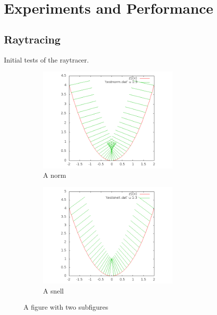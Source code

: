 \section{Experiments and Performance}
\label{experiments}

\subsection{Raytracing}

Initial tests of the raytracer.

\begin{figure}
\centering
\begin{subfigure}{.5\textwidth}
  \centering
  \includegraphics[width=7cm]{out.png}
  \caption{A norm}
  \label{fig:sub1}
\end{subfigure}%
\begin{subfigure}{.5\textwidth}
  \centering
  \includegraphics[width=7cm]{out2.png}
  \caption{A snell}
  \label{fig:sub2}
\end{subfigure}
\caption{A figure with two subfigures}
\label{fig:test}
\end{figure}

